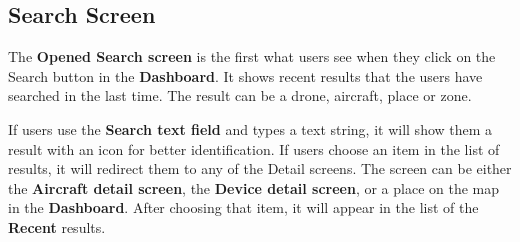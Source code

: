 \subsection{Search Screen}\label{subsec:search-screen}
The \textbf{Opened Search screen} is the first what users see when they click on the Search button in the \textbf{Dashboard}.
It shows recent results that the users have searched in the last time.
The result can be a drone, aircraft, place or zone.

If users use the \textbf{Search text field} and types a text string, it will show them a result with an icon for better identification.
If users choose an item in the list of results, it will redirect them to any of the Detail screens.
The screen can be either the \textbf{Aircraft detail screen}, the \textbf{Device detail screen}, or a place on the map in the \textbf{Dashboard}.
After choosing that item, it will appear in the list of the \textbf{Recent} results.
